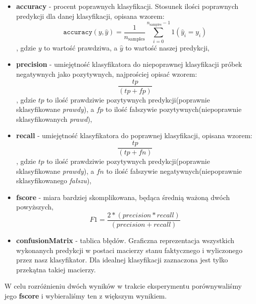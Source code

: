 	\begin{itemize}
		\item \textbf{accuracy} - procent poprawnych klasyfikacji. Stosunek ilości poprawnych predykcji dla danej klasyfikacji, opisana wzorem:
		\[\texttt{accuracy}(y, \hat{y}) = \frac{1}{n_\text{samples}} \sum_{i=0}^{n_\text{samples}-1} 1(\hat{y}_i = y_i)\]
		, gdzie $y$ to wartość prawdziwa, a $\hat{y}$ to wartość naszej predykcji,
		\item \textbf{precision} - umiejętność klasyfikatora do niepoprawnej klasyfikacji próbek negatywnych jako pozytywnych, najprościej opisać wzorem:
		\[ \frac{tp}{(tp + fp)}\] 
		, gdzie $tp$ to ilość prawdziwie pozytywnych predykcji(poprawnie sklasyfikowane \textit{prawdy}), a $fp$ to ilość fałszywie pozytywnych(niepoprawnie sklasyfikowanych \textit{prawd}),
		\item \textbf{recall} - umiejętność klasyfikatora do poprawnej klasyfikacji, opisana wzorem:
		\[ \frac{tp}{(tp + fn)}\]
		, gdzie $tp$ to ilość prawdziwie pozytywnych predykcji(poprawnie sklasyfikowane \textit{prawdy}), a $fn$ to ilość fałszywie negatywnych(niepoprawnie sklasyfikowanego \textit{fałszu}),
		\item \textbf{fscore} - miara bardziej skomplikowana, będąca średnią ważoną dwóch powyższych,
		\[F1 = \frac{2 * (precision * recall)}{ (precision + recall)} \] 
		\item \textbf{confusionMatrix} - tablica błędów. Graficzna reprezentacja wszystkich wykonanych predykcji w postaci macierzy stanu faktycznego i wyliczonego przez nasz klasyfikator. Dla idealnej klasyfikacji zaznaczona jest tylko przekątna takiej macierzy.
	\end{itemize}

	W celu rozróżnieniu dwóch wyników w trakcie eksperymentu porównywaliśmy jego \textbf{fscore} i wybieraliśmy ten z większym wynikiem.